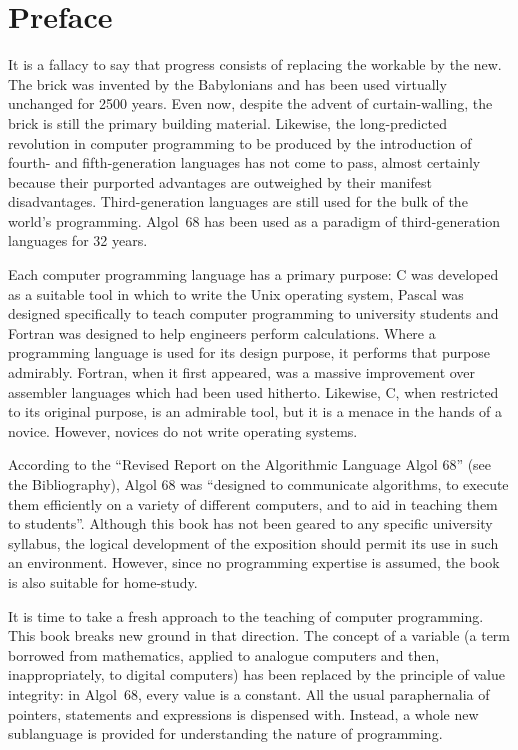 %
%
%
\parindent=5mm
\chapter{Preface}
It is a fallacy to say that progress consists of replacing the workable
by the new.  The brick was invented by the Babylonians and has been
used virtually unchanged for 2500 years.  Even now, despite the advent
of curtain-walling, the brick is still the primary building material.
Likewise, the long-predicted revolution in computer programming to be
produced by the introduction of fourth- and fifth-generation languages
has not come to pass, almost certainly because their purported
advantages are outweighed by their manifest disadvantages. 
Third-generation languages are still used for the bulk of the world's
programming.  Algol~68 has been used as a paradigm of third-generation
languages for 32 years.

Each computer programming language has a primary purpose: C was
developed as a suitable tool in which to write the Unix operating
system, Pascal was designed specifically to teach computer programming
to university students and Fortran was designed to help engineers
perform calculations. Where a programming language is used for its
design purpose, it performs that purpose admirably. Fortran, when it
first appeared, was a massive improvement over assembler languages
which had been used hitherto.  Likewise, C, when restricted to its
original purpose, is an admirable tool, but it is a menace in the hands
of a novice.  However, novices do not write operating systems.

According to the ``Revised Report on the Algorithmic Language Algol
68'' (see the Bibliography), Algol 68 was ``designed to communicate
algorithms, to execute them efficiently on a variety of different
computers, and to aid in teaching them to students''.  Although this
book has not been geared to any specific university syllabus, the
logical development of the exposition should permit its use in such an
environment.  However, since no programming expertise is assumed, the
book is also suitable for home-study.

It is time to take a fresh approach to the teaching of computer
programming.  This book breaks new ground in that direction.  The
concept of a variable (a term borrowed from mathematics, applied to
analogue computers and then, inappropriately, to digital computers) has
been replaced by the principle of value integrity: in Algol~68, every
value is a constant.  All the usual paraphernalia of pointers,
statements and expressions is dispensed with. Instead, a whole new
sublanguage is provided for understanding the nature of programming.

